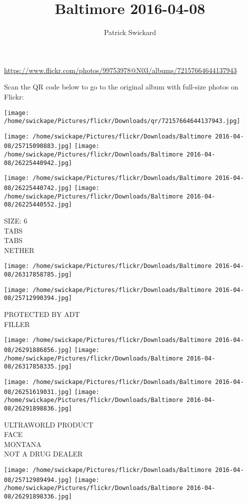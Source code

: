 \documentclass[10pt,letterpaper]{article}
\title{Baltimore 2016-04-08}
\author{Patrick Swickard}
\date{}
\begin{document}
\maketitle

\url{https://www.flickr.com/photos/99753978@N03/albums/72157664644137943}

Scan the QR code below to go to the original album with full-size photos on Flickr:

\texttt{[image: /home/swickape/Pictures/flickr/Downloads/qr/72157664644137943.jpg]}
\pagebreak

\texttt{[image: /home/swickape/Pictures/flickr/Downloads/Baltimore 2016-04-08/25715090883.jpg]}
\texttt{[image: /home/swickape/Pictures/flickr/Downloads/Baltimore 2016-04-08/26225440942.jpg]}

\texttt{[image: /home/swickape/Pictures/flickr/Downloads/Baltimore 2016-04-08/26225440742.jpg]}
\texttt{[image: /home/swickape/Pictures/flickr/Downloads/Baltimore 2016-04-08/26225440552.jpg]}

SIZE: 6\\
TABS\\
TABS\\
NETHER
\pagebreak

\texttt{[image: /home/swickape/Pictures/flickr/Downloads/Baltimore 2016-04-08/26317858785.jpg]}

\vspace{0.25in}
\texttt{[image: /home/swickape/Pictures/flickr/Downloads/Baltimore 2016-04-08/25712990394.jpg]}

PROTECTED BY ADT\\
FILLER
\pagebreak

\texttt{[image: /home/swickape/Pictures/flickr/Downloads/Baltimore 2016-04-08/26291886856.jpg]}
\texttt{[image: /home/swickape/Pictures/flickr/Downloads/Baltimore 2016-04-08/26317858335.jpg]}

\texttt{[image: /home/swickape/Pictures/flickr/Downloads/Baltimore 2016-04-08/26251619031.jpg]}
\texttt{[image: /home/swickape/Pictures/flickr/Downloads/Baltimore 2016-04-08/26291898836.jpg]}

ULTRAWORLD PRODUCT\\
FACE\\
MONTANA\\
NOT A DRUG DEALER
\pagebreak

\texttt{[image: /home/swickape/Pictures/flickr/Downloads/Baltimore 2016-04-08/25712989494.jpg]}
\texttt{[image: /home/swickape/Pictures/flickr/Downloads/Baltimore 2016-04-08/26291898336.jpg]}
\end{document}
